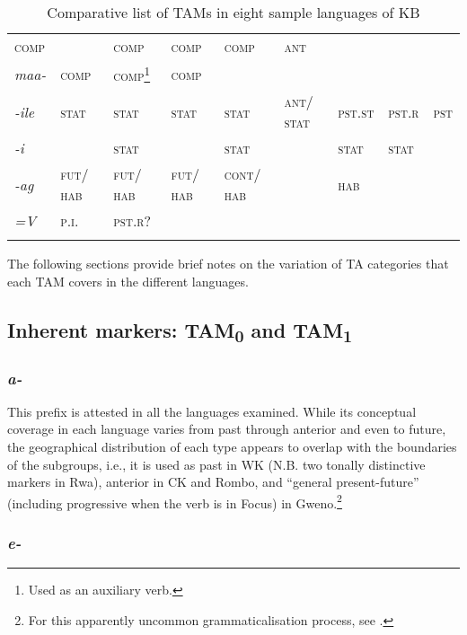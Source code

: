 \documentclass[output=paper]{langscibook}
\begin{document}
\begin{table}
\begin{tabularx}{\textwidth}{QQQQQQQQQ}
{\scshape comp} &  & {\scshape comp} & {\scshape comp} & {\scshape comp} & {\scshape ant}\\
\tablevspace
{\itshape maa-} & {\scshape comp} & {\scshape comp}\footnote{Used as an auxiliary verb.} & {\scshape comp}  &  &  &  &  & \\
\tablevspace
{\itshape {}-ile} & {\scshape stat} & {\scshape stat} & {\scshape stat} & {\scshape stat} & {\textsc{ant/} \textsc{stat}} & {\scshape pst.st} & {\scshape pst.r} & {\scshape pst}\\
\tablevspace
{\itshape {}-i} &  & {\scshape stat} &  & {\scshape stat} &  & {\scshape stat} & {\scshape stat} & \\
\tablevspace
{\itshape {}-ag} & {\scshape fut/ hab} & {\scshape fut/ hab} & {\scshape fut/ hab} & {\scshape cont/ hab} &  & {\scshape hab} &  & \\
\tablevspace
{\itshape =V} & {\scshape p.i.} & {\scshape pst.r?} &  &  &  &  &  & \\
\lspbottomrule
\end{tabularx}
\caption{Comparative list of TAMs in eight sample languages of KB}
\label{tab:shinagawa:9}
\end{table}


The following sections provide brief notes on the variation of TA categories that each TAM covers in the different languages.

\subsection{Inherent markers: TAM\textsubscript{0} and TAM\textsubscript{1}}\label{sec:shinagawa:3.1}

\subsubsection{\textit{a-}}\label{sec:shinagawa:3.1.1}

This prefix is attested in all the languages examined. While its conceptual coverage in each language varies from past through anterior and even to future, the geographical distribution of each type appears to overlap with the boundaries of the subgroups, i.e., it is used as past in WK (N.B. two tonally distinctive markers in Rwa), anterior in CK and Rombo, and “general present-future” (including progressive when the verb is in Focus) in Gweno.\footnote{For this apparently uncommon grammaticalisation process, see \citet[74--75]{Nurse2003a}.}

\subsubsection{\textit{e-}}\label{sec:shinagawa:3.1.2}
\end{document}
